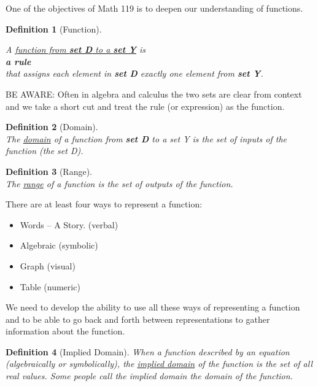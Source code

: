 \documentclass{article}
\theoremstyle{plain}
\theoremstyle{box}
\newtheorem*{definition*}{Definition}
\begin{document}
\noindent One of the objectives of Math 119 is to deepen our understanding of functions.
\begin{definition*}[Function]\hfill
\begin{center}A \underline{function from \textbf{set D} to a \textbf{set Y}} is\\[0.25in]
 \textbf{a rule}\\[0.25in]
that assigns each element in \textbf{set D} exactly one element from \textbf{set Y}.\end{center}
\end{definition*}
\noindent BE AWARE: Often in algebra and calculus the two sets are clear from context and we take a short cut and treat the rule (or expression) as the function.
\vspace{0.1in}

\begin{definition*}[Domain]\hfill \\
The \underline{domain} of a function from \textbf{set D} to a set Y is the set of inputs of the function (the set D).
\end{definition*}

\begin{definition*}[Range]\hfill \\
The \underline{range} of a function is the set of outputs of the function.
\end{definition*}
\vspace{0.1in}

\newpage
\noindent There are at least four ways to represent a function:
\begin{itemize}
\item Words -- A Story. (verbal)
\item Algebraic (symbolic)
\item Graph (visual)
\item Table (numeric)
\end{itemize}
We need to develop the ability to use all these ways of representing a function and to be able to go back and forth between representations to gather information about the function.

\newpage
\begin{definition*}[Implied Domain]
When a function described by an equation (algebraically or symbolically), the \underline{implied domain} of the function is the set of all real values. Some people call the implied domain the domain of the function.
\end{definition*}
\end{document}

